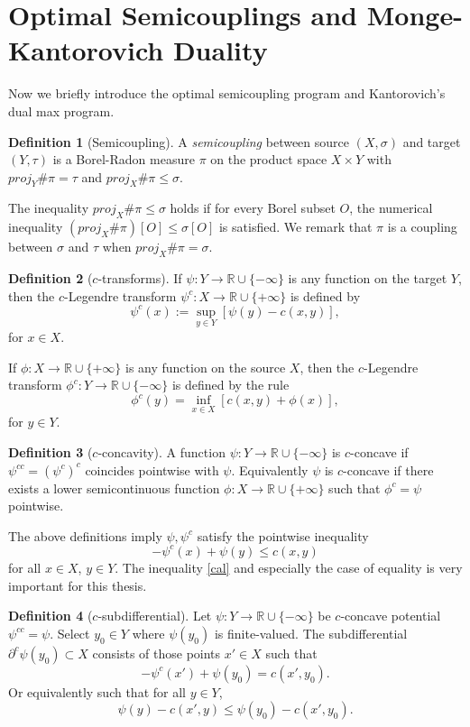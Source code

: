 \documentclass[12pt]{amsart}
\theoremstyle{definition}
\newtheorem{dfn}{Definition}
\theoremstyle{remark}
\newcommand{\bR}{\mathbb{R}}
\newcommand{\del}{\partial}
\begin{document}
\section{Optimal Semicouplings and Monge-Kantorovich Duality}\label{22-1}
Now we briefly introduce the optimal semicoupling program and Kantorovich's dual max program.  
\begin{dfn}[Semicoupling]
A \emph{semicoupling} between source $(X,\sigma)$ and target $(Y, \tau)$ is a Borel-Radon measure $\pi$ on the product space $X\times Y$ with $proj_Y \# \pi=\tau$ and $proj_X \# \pi \leq \sigma$. 
\end{dfn} The inequality $proj_X \# \pi \leq \sigma$ holds if for every Borel subset $O$, the numerical inequality $(proj_X \# \pi )[O]\leq \sigma[O]$ is satisfied. We remark that $\pi$ is a coupling between $\sigma$ and  $\tau$ when $proj_X \# \pi = \sigma$. 


\begin{dfn}[$c$-transforms]
If $\psi: Y\to \bR \cup \{-\infty\}$ is any function on the target $Y$, then the $c$-Legendre transform $\psi^c: X\to \bR \cup\{+\infty\}$ is defined by $$\psi^c (x):=\sup_{y\in Y} [\psi(y)-c(x,y)], $$ for $x\in X$. 

If $\phi: X \to \bR \cup \{+\infty \} $ is any function on the source $X$, then the $c$-Legendre transform $\phi^c: Y\to \bR \cup \{-\infty\}$ is defined by the rule $$\phi^c(y)=\inf_{x\in X} [c(x,y) + \phi(x)],$$ for $y\in Y$. 
\end{dfn}

\begin{dfn}
[$c$-concavity]\label{c-concavity}
A function $\psi: Y\to \bR \cup \{-\infty\}$ is $c$-concave if $\psi^{cc}=(\psi^{c})^c$ coincides pointwise with $\psi$. Equivalently $\psi$ is $c$-concave if there exists a lower semicontinuous function $\phi: X\to \bR \cup \{+\infty\}$ such that $\phi^c = \psi$ pointwise. 
\end{dfn}

The above definitions imply $\psi, \psi^c$ satisfy the pointwise inequality 
\begin{equation} 
-\psi^c (x)+\psi(y) \leq c(x,y) \label{cal}
\end{equation}
 for all $x \in X$, $y\in Y$. The inequality \eqref{cal} and especially the case of equality is very important for this thesis.
\begin{dfn}
[$c$-subdifferential]\label{subdif}
Let $\psi: Y\to \bR \cup \{-\infty\}$ be $c$-concave potential $\psi^{cc}=\psi$. Select $y_0\in Y$ where $\psi(y_0)$ is finite-valued. The subdifferential $\del^c \psi(y_0) \subset X$ consists of those points $x'\in X$ such that $$-\psi^c(x')+\psi(y_0) = c(x', y_0).$$ Or equivalently such that for all $y\in Y$, $$\psi(y)-c(x',y) \leq \psi(y_0)-c(x',y_0).$$
\end{dfn}
\end{document}
